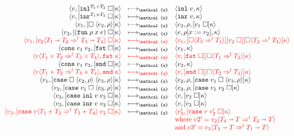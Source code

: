 \documentclass[acmsmall,review,anonymous]{acmart}\settopmatter{printfolios=true,printccs=false,printacmref=false}
\newcommand{\plus}[0]{+}
\newcommand{\sOOinspect}[3]{\langle#1,#2,#3\rangle}
\newcommand{\sOOreturn}[2]{\langle#1,#2\rangle}
\newcommand{\POOfun}[2]{#1 \shortrightarrow #2}
\newcommand{\POOprod}[2]{#1 \times #2}
\newcommand{\POOsum}[2]{#1 \plus #2}
\newcommand{\cOOcast}[3]{#1 \Rightarrow^{#2} #3}
\newcommand{\vOOcast}[2]{#1\langle#2\rangle}
\newcommand{\vOOfun}[3]{\mathtt{fun} \; #1 \; #2 \; #3}
\newcommand{\vOOcons}[2]{\mathtt{cons}\;#1\;#2}
\newcommand{\vOOinl}[1]{\mathtt{inl}\;#1}
\newcommand{\vOOinr}[1]{\mathtt{inr}\;#1}
\newcommand{\kOOinl}[3]{[\mathtt{inl}^{\POOsum{#1}{#2}}\; \square]#3}
\newcommand{\kOOinr}[3]{[\mathtt{inr}^{\POOsum{#1}{#2}}\; \square]#3}
\newcommand{\kOOappI}[3]{
  [\square \; \langle#1,#2\rangle]#3
}
\newcommand{\kOOappII}[2]{
  [#1 \; \square]#2}
\newcommand{\kOOcar}[1]{[\mathtt{fst} \; \square]#1}
\newcommand{\kOOcdr}[1]{[\mathtt{snd} \; \square]#1}
\newcommand{\kOOcaseI}[4]{
  [\mathtt{case} \; \square \; \langle#1,#3\rangle \; \langle#2,#3\rangle ]#4}
\newcommand{\kOOcaseII}[4]{
  [\mathtt{case} \; #1 \; \square \; \langle#2,#3\rangle ]#4}
\newcommand{\kOOcaseIII}[3]{
  [\mathtt{case} \; #1 \; #2 \; \square]#3}
\newcommand{\kOOcast}[2]{
  [\square \langle #1 \rangle]#2}
\newcommand{\redrule}[3]{#1 & \longmapsto_\mathcal{x} & #2 & #3\\}
\newcommand{\hiredrule}[3]{\highlight{#1} & \highlight{\longmapsto_\mathcal{x}} 
& \highlight{#2} & \highlight{#3} \\}
\newcommand{\highlight}[1]{{\color{red} #1}}
\begin{document}
\begin{figure}
\[\begin{array}{rclr}
\redrule{
\sOOreturn{v}{\kOOinl{T_1}{T_2}{\kappa}}}{
\sOOreturn{\vOOinl{v}}{\kappa}}{}

\redrule{
\sOOreturn{v}{\kOOinr{T_1}{T_2}{\kappa}}}{
\sOOreturn{\vOOinr{v}}{\kappa}}{}

\redrule{
\sOOreturn{v_1}{\kOOappI{e_2}{\rho}{\kappa}}}{
\sOOinspect{e_2}{\rho}{\kOOappII{v_1}{\kappa}}}{}

\redrule{
\sOOreturn{v_2}{\kOOappII{(\vOOfun{\rho}{x}{e})}{\kappa}}}{
\sOOinspect{e}{\rho[x:=v_2]}{\kappa}}{}
  \hiredrule{
    \sOOreturn{v_1}{
      \kOOappII{\vOOcast{v_2}{
          \cOOcast{\POOfun{T_1}{T_2}}{l}{\POOfun{T_3}{T_4}}
      }}{\kappa}
    }
  }{
    \sOOreturn{v_1}{
      \kOOcast{\cOOcast{T_3}{l}{T_1}}{
        \kOOappII{v_2}{
          \kOOcast{\cOOcast{T_2}{l}{T_4}}{\kappa}
        }
      }
    }
  }{}
  \redrule{
  \sOOreturn{
    \vOOcons{v_1}{v_2}
  }{\kOOcar{\kappa}}
  }{
  \sOOreturn{v_1}{\kappa}
  }{}
  \hiredrule{
    \sOOreturn{
      \vOOcast{v}{\cOOcast{\POOprod{T_1}{T_2}}{l}{
          \POOprod{T_3}{T_4}}}
    }{\mathtt{fst} \; \kappa}
  }{
    \sOOreturn{v}{
      \kOOcar{
        \kOOcast{\cOOcast{T_1}{l}{T_3}}{\kappa}
      }}
  }{}
  \redrule{
  \sOOreturn{
  \vOOcons{v_1}{v_2}
  }{\kOOcdr{\kappa}}
  }{
  \sOOreturn{v_2}{\kappa}
  }{}
  
  \hiredrule{
    \sOOreturn{
      \vOOcast{v}{\cOOcast{\POOprod{T_1}{T_2}}{l}{
          \POOprod{T_3}{T_4}}}
    }{\mathtt{snd} \; \kappa}
  }{
    \sOOreturn{v}{
      \kOOcdr{\kOOcast{\cOOcast{T_2}{l}{T_4}}{\kappa}}}
  }{}

\redrule{
\sOOreturn{v_1}{\kOOcaseI{e_2}{e_3}{\rho}{\kappa}}}{
\sOOinspect{e_2}{\rho}{\kOOcaseII{v_1}{e_3}{\rho}{\kappa}}}{}

\redrule{
\sOOreturn{v_2}{\kOOcaseII{v_1}{e_3}{\rho}{\kappa}}}{
\sOOinspect{e_3}{\rho}{
  \kOOcaseIII{v_1}{v_2}{\kappa}
}}{}  

\redrule{
\sOOreturn{v_3}{
  \kOOcaseIII{\vOOinl{v}}{v_2}{\kappa}
}
}{
\sOOreturn{v}{\kOOappII{v_2}{\kappa}}
}{}

\redrule{
  \sOOreturn{v_3}{
    \kOOcaseIII{\vOOinr{v}}{v_2}{\kappa}
  }
}{
\sOOreturn{v}{\kOOappII{v_3}{\kappa}}
}{}

\redrule{
  \highlight{\sOOreturn{v_3}{
    \kOOcaseIII{
        \vOOcast{v}{\cOOcast{\POOsum{T_1}{T_2}}{l}{\POOsum{T_3}{T_4}}}
      }{v_2}{\kappa}
  }}
}{
  \highlight{\sOOreturn{v_3'}{
      \kOOcaseIII{v}{v_2'}{\kappa}
  }}
}{\\&&
\highlight{\text{where}\;
v2' = \vOOcast{v_2}{\cOOcast{\POOfun{T_4}{T}}{l}{\POOfun{T_2}{T}}}}
\\&&
\highlight{\text{and}\;
v3' = \vOOcast{v_3}{\cOOcast{\POOfun{T_3}{T}}{l}{\POOfun{T_1}{T}}}}
}
  

\end{array}\]
\end{figure}
\end{document}
